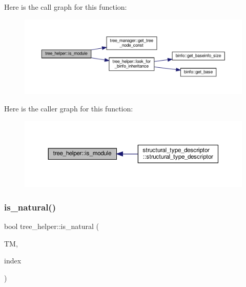 Here is the call graph for this function\+:
\nopagebreak
\begin{figure}[H]
\begin{center}
\leavevmode
\includegraphics[width=350pt]{d7/d99/classtree__helper_a7ca2622f28872c5e2c61bde0bfe37610_cgraph}
\end{center}
\end{figure}
Here is the caller graph for this function\+:
\nopagebreak
\begin{figure}[H]
\begin{center}
\leavevmode
\includegraphics[width=350pt]{d7/d99/classtree__helper_a7ca2622f28872c5e2c61bde0bfe37610_icgraph}
\end{center}
\end{figure}
\mbox{\label{classtree__helper_a7d79cc8b2338c134901fb22916b8a57e}} 
\subsubsection{\texorpdfstring{is\+\_\+natural()}{is\_natural()}}
{\footnotesize\ttfamily bool tree\+\_\+helper\+::is\+\_\+natural (\begin{DoxyParamCaption}\item[{const \hyperlink{tree__manager_8hpp_a792e3f1f892d7d997a8d8a4a12e39346}{tree\+\_\+manager\+Const\+Ref} \&}]{TM,  }\item[{const unsigned int}]{index }\end{DoxyParamCaption})\hspace{0.3cm}{\ttfamily [static]}}



